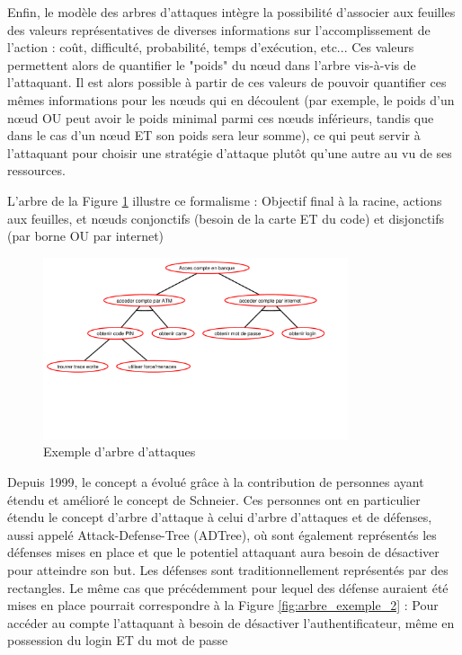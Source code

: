         Enfin, le modèle des arbres d'attaques intègre la possibilité d'associer aux feuilles des valeurs représentatives de diverses informations sur l'accomplissement de l'action : coût, difficulté, probabilité, temps d'exécution, etc... Ces valeurs permettent alors de quantifier le "poids" du nœud dans l'arbre vis-à-vis de l'attaquant.  Il est alors possible à partir de ces valeurs de pouvoir quantifier ces mêmes informations pour les nœuds qui en découlent (par exemple, le poids d'un nœud OU peut avoir le poids minimal parmi ces nœuds inférieurs, tandis que dans le cas d'un nœud ET son poids sera leur somme), ce qui peut servir à l'attaquant pour choisir une stratégie d'attaque plutôt qu'une autre au vu de ses ressources.

		L'arbre de la Figure \ref{fig:arbre_exemple_1} illustre ce formalisme : Objectif final à la racine, actions aux feuilles, et nœuds conjonctifs (besoin de la carte ET du code) et disjonctifs (par borne OU par internet) 

		\begin{figure}
			\begin{center}
				\includegraphics[width=0.8\textwidth]{figure/exemple1_rapport.pdf}
			\end{center}
			\caption{Exemple d'arbre d'attaques}
			\label{fig:arbre_exemple_1}
		\end{figure}

		Depuis 1999, le concept a évolué grâce à la contribution de personnes ayant étendu et amélioré le concept de Schneier. Ces personnes ont en particulier étendu le concept d'arbre d'attaque à celui d'arbre d'attaques et de défenses, aussi appelé Attack-Defense-Tree (ADTree), où sont également représentés les défenses mises en place et que le potentiel attaquant aura besoin de désactiver pour atteindre son but. Les défenses sont traditionnellement représentés par des rectangles. Le même cas que précédemment pour lequel des défense auraient été mises en place pourrait correspondre à la Figure \ref{fig:arbre_exemple_2} : Pour accéder au compte l'attaquant à besoin de désactiver l'authentificateur, même en possession du login ET du mot de passe

